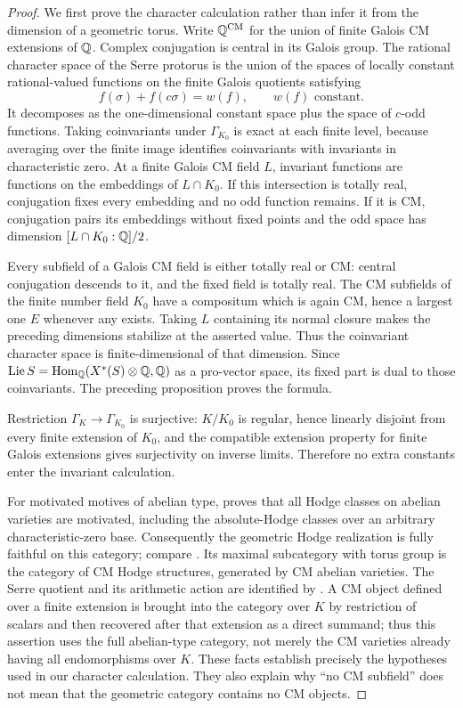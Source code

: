 \begin{proof}
We first prove the character calculation rather than infer it from the dimension of a geometric torus. Write $\mathbb Q^{\mathrm{CM}}$ for the union of finite Galois CM extensions of $\mathbb Q$. Complex conjugation is central in its Galois group. The rational character space of the Serre protorus is the union of the spaces of locally constant rational-valued functions on the finite Galois quotients satisfying
\[
 f(\sigma)+f(c\sigma)=w(f),\qquad w(f)\text{ constant}.
\]
It decomposes as the one-dimensional constant space plus the space of $c$-odd functions. Taking coinvariants under $\Gamma_{K_0}$ is exact at each finite level, because averaging over the finite image identifies coinvariants with invariants in characteristic zero. At a finite Galois CM field $L$, invariant functions are functions on the embeddings of $L\cap K_0$. If this intersection is totally real, conjugation fixes every embedding and no odd function remains. If it is CM, conjugation pairs its embeddings without fixed points and the odd space has dimension $[L\cap K_0:\mathbb Q]/2$.

Every subfield of a Galois CM field is either totally real or CM: central conjugation descends to it, and the fixed field is totally real. The CM subfields of the finite number field $K_0$ have a compositum which is again CM, hence a largest one $E$ whenever any exists. Taking $L$ containing its normal closure makes the preceding dimensions stabilize at the asserted value. Thus the coinvariant character space is finite-dimensional of that dimension. Since $\operatorname{Lie} S=\operatorname{Hom}_\mathbb Q(X^*(S)\otimes\mathbb Q,\mathbb Q)$ as a pro-vector space, its fixed part is dual to those coinvariants. The preceding proposition proves the formula.

Restriction $\Gamma_K\to\Gamma_{K_0}$ is surjective: $K/K_0$ is regular, hence linearly disjoint from every finite extension of $K_0$, and the compatible extension property for finite Galois extensions gives surjectivity on inverse limits. Therefore no extra constants enter the invariant calculation.

For motivated motives of abelian type, \citet[Theorem 0.6.2 and the remark following its proof in \S6]{c_andre1996} proves that all Hodge classes on abelian varieties are motivated, including the absolute-Hodge classes over an arbitrary characteristic-zero base. Consequently the geometric Hodge realization is fully faithful on this category; compare \citet[Theorem 8.25 and Proposition 8.23]{c_delignehodge1982}. Its maximal subcategory with torus group is the category of CM Hodge structures, generated by CM abelian varieties. The Serre quotient and its arithmetic action are identified by \citet[unnumbered Theorem, p.~262, and Lemmas 1--2]{c_delignetaniyama1982}. A CM object defined over a finite extension is brought into the category over $K$ by restriction of scalars and then recovered after that extension as a direct summand; thus this assertion uses the full abelian-type category, not merely the CM varieties already having all endomorphisms over $K$. These facts establish precisely the hypotheses used in our character calculation. They also explain why ``no CM subfield'' does not mean that the geometric category contains no CM objects.
\end{proof}

